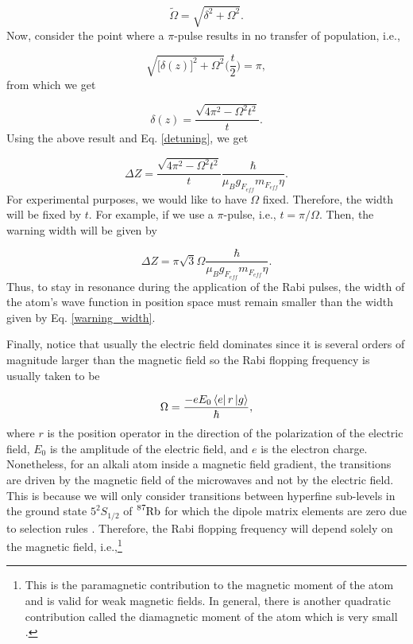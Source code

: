 \documentclass{article}
\begin{document}
\begin{equation}\label{omega_tilde_definition}
  \tilde{\Omega} = \sqrt{\delta^{2} + \Omega^{2}}.
\end{equation}
%
Now, consider the point where a $\pi$-pulse results in no transfer of population, i.e., 

\begin{equation}\label{detuning_condition}
\sqrt{\big[ \delta (z) \big]^{2} + \Omega^{2}} \bigg( \frac{t}{2} \bigg) = \pi,
\end{equation}
%
from which we get

\begin{equation}\label{detuning_at_zhwm}
\delta (z) = \frac{\sqrt{4 \pi^{2} - \Omega^{2} t^{2}}}{t}.
\end{equation}
%
Using the above result and Eq. \ref{detuning}, we get

\begin{equation}\label{width_set_by_detuning}
\Delta Z = \frac{\sqrt{4 \pi^{2} - \Omega^{2} t^{2}}}{t} \frac{\hbar}{\mu_{B} g_{F_{eff}} m_{F_{eff}} \eta}.
\end{equation}
%
For experimental purposes, we would like to have $\Omega$ fixed. Therefore, the width will be fixed by $t$. For example, if we use a $\pi$-pulse, i.e., $t=\pi/\Omega$. Then, the warning width will be given by

\begin{equation}\label{warning_width}
\Delta Z = \pi \sqrt{3} \Omega \frac{\hbar}{\mu_{B} g_{F_{eff}} m_{F_{eff}} \eta}.
\end{equation}
%
Thus, to stay in resonance during the application of the Rabi pulses, the width of the atom's wave function in position space must remain smaller than the width given by Eq. \ref{warning_width}.

Finally, notice that usually the electric field dominates since it is several orders of magnitude larger than the magnetic field so the Rabi flopping frequency is usually taken to be

\begin{equation*}
\Omega = \frac{- e E_{0} \bra{e} r \ket{g}}{\hbar},
\end{equation*}
%
where $r$ is the position operator in the direction of the polarization of the electric field, $E_{0}$ is the amplitude of the electric field, and $e$ is the electron charge. Nonetheless, for an alkali atom inside a magnetic field gradient, the transitions are driven by the magnetic field of the microwaves and not by the electric field. This is because we will only consider transitions between hyperfine sub-levels in the ground state $5^{2}S_{1/2}$ of $\ce{^{87}_{}Rb}$ \cite{Castanos2014} for which the dipole matrix elements are zero due to selection rules \cite{Steck2010}. Therefore, the Rabi flopping frequency will depend solely on the magnetic field, i.e.,\footnote{This is the paramagnetic contribution to the magnetic moment of the atom and is valid for weak magnetic fields. In general, there is another quadratic contribution called the diamagnetic moment of the atom which is very small \cite{scotto2016}.}
\end{document}
